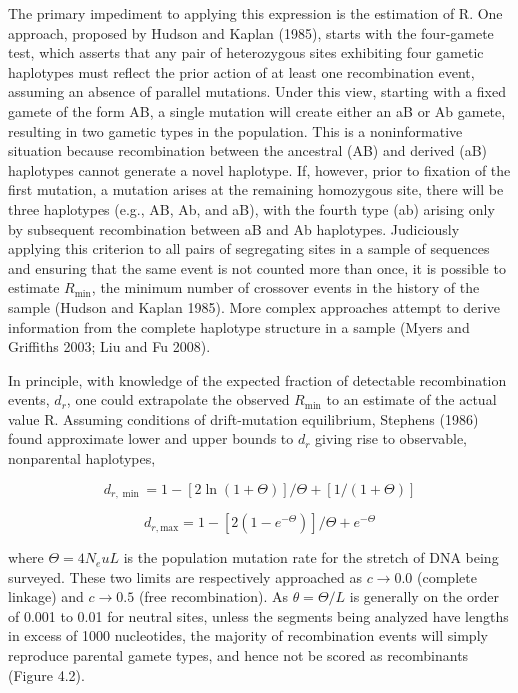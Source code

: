 \documentclass{article}
\begin{document}
The primary impediment to applying this expression is the estimation of R. One approach, proposed by Hudson and Kaplan (1985), starts with the four-gamete test, which asserts that any pair of heterozygous sites exhibiting four gametic haplotypes must reflect the prior action of at least one recombination event, assuming an absence of parallel mutations. Under this view, starting with a fixed gamete of the form AB, a single mutation will create either an aB or Ab gamete, resulting in two gametic types in the population. This is a noninformative situation because recombination between the ancestral (AB) and derived (aB) haplotypes cannot generate a novel haplotype. If, however, prior to fixation of the first mutation, a mutation arises at the remaining homozygous site, there will be three haplotypes (e.g., AB, Ab, and aB), with the fourth type (ab) arising only by subsequent recombination between aB and Ab haplotypes. Judiciously applying this criterion to all pairs of segregating sites in a sample of sequences and ensuring that the same event is not counted more than once, it is possible to estimate  $ R_{\min} $, the minimum number of crossover events in the history of the sample (Hudson and Kaplan 1985). More complex approaches attempt to derive information from the complete haplotype structure in a sample (Myers and Griffiths 2003; Liu and Fu 2008).

In principle, with knowledge of the expected fraction of detectable recombination events,  $ d_{r} $, one could extrapolate the observed  $ R_{\min} $ to an estimate of the actual value R. Assuming conditions of drift-mutation equilibrium, Stephens (1986) found approximate lower and upper bounds to  $ d_{r} $ giving rise to observable, nonparental haplotypes,

\begin{equation}
d_{r,\min}=1-[2\ln(1+\Theta)]/\Theta+[1/(1+\Theta)]
\tag{4.8a}
\label{eq:4_8a}
\end{equation}

\begin{equation}
d_{r,\mathrm{max}}=1-\left[2(1-e^{-\Theta})\right]/\Theta+e^{-\Theta}
\tag{4.8b}
\label{eq:4_8b}
\end{equation}

where  $ \Theta = 4N_{e}uL $ is the population mutation rate for the stretch of DNA being surveyed. These two limits are respectively approached as  $ c \to 0.0 $ (complete linkage) and  $ c \to 0.5 $ (free recombination). As  $ \theta = \Theta/L $ is generally on the order of 0.001 to 0.01 for neutral sites, unless the segments being analyzed have lengths in excess of 1000 nucleotides, the majority of recombination events will simply reproduce parental gamete types, and hence not be scored as recombinants (Figure 4.2).
\end{document}
